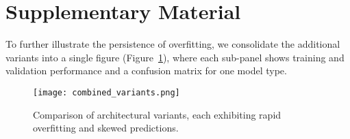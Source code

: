 \documentclass{article}
\begin{document}


\appendix

\section{Supplementary Material}
To further illustrate the persistence of overfitting, we consolidate the additional variants into a single figure (Figure~\ref{fig:variants}), where each sub-panel shows training and validation performance and a confusion matrix for one model type.

\begin{figure}[h]
  \centering
  \texttt{[image: combined\_variants.png]}
  \caption{Comparison of architectural variants, each exhibiting rapid overfitting and skewed predictions.}
  \label{fig:variants}
\end{figure}
\end{document}
